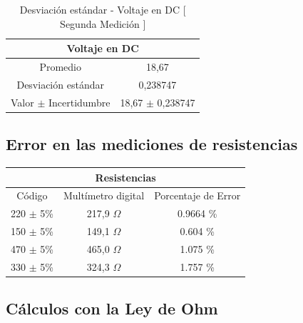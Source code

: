 \documentclass[letterpaper, 12pt]{report}
\begin{document}
\begin{table}[H]
	\begin{center}
		\begin{tabular}{|c|c|}
			\multicolumn{2}{c}{Voltaje en DC}                \\ \hline
			Promedio                  & 18,67                \\ \hline
			Desviación estándar       & 0,238747             \\ \hline
			Valor $\pm$ Incertidumbre & 18,67 $\pm$ 0,238747 \\ \hline
		\end{tabular}
		\caption{Desviación estándar - Voltaje en DC [ Segunda Medición ]}
	\end{center}
\end{table}

\subsection{Error en las mediciones de resistencias}

\begin{table}[H]
	\begin{center}
		\begin{tabular}{|c|c|c|}
			\multicolumn{3}{c}{Resistencias}                         \\ \hline
			Código        & Multímetro digital & Porcentaje de Error \\ \hline
			220 $\pm$ 5\% & 217,9 $\Omega$     & 0.9664 \%           \\ \hline
			150 $\pm$ 5\% & 149,1 $\Omega$     & 0.604  \%           \\ \hline
			470 $\pm$ 5\% & 465,0 $\Omega$     & 1.075  \%           \\ \hline
			330 $\pm$ 5\% & 324,3 $\Omega$     & 1.757  \%           \\ \hline
		\end{tabular}
	\end{center}
\end{table}

\subsection{Cálculos con la Ley de Ohm}
\end{document}
